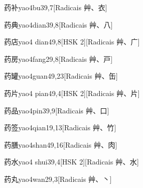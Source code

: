 \begin{entry}{药补}{yao4bu3}{9,7}[Radicais ⾋、⾐]
\end{entry}

\begin{entry}{药典}{yao4dian3}{9,8}[Radicais ⾋、⼋]
\end{entry}

\begin{entry}{药店}{yao4 dian4}{9,8}[HSK 2][Radicais ⾋、⼴]
\end{entry}

\begin{entry}{药房}{yao4fang2}{9,8}[Radicais ⾋、⼾]
\end{entry}

\begin{entry}{药罐}{yao4guan4}{9,23}[Radicais ⾋、⽸]
\end{entry}

\begin{entry}{药片}{yao4 pian4}{9,4}[HSK 2][Radicais ⾋、⽚]
\end{entry}

\begin{entry}{药品}{yao4pin3}{9,9}[Radicais ⾋、⼝]
\end{entry}

\begin{entry}{药签}{yao4qian1}{9,13}[Radicais ⾋、⽵]
\end{entry}

\begin{entry}{药膳}{yao4shan4}{9,16}[Radicais ⾋、⾁]
\end{entry}

\begin{entry}{药水}{yao4 shui3}{9,4}[HSK 2][Radicais ⾋、⽔]
\end{entry}

\begin{entry}{药丸}{yao4wan2}{9,3}[Radicais ⾋、⼂]
\end{entry}

